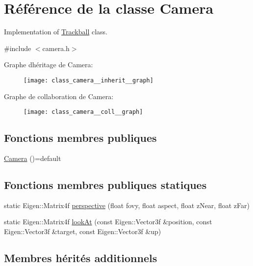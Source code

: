 \hypertarget{class_camera}{}\section{Référence de la classe Camera}
\label{class_camera}


Implementation of \hyperlink{class_trackball}{Trackball} class.  




{\ttfamily \#include $<$camera.\+h$>$}



Graphe d\textquotesingle{}héritage de Camera\+:\nopagebreak
\begin{figure}[H]
\begin{center}
\leavevmode
\texttt{[image: class\_camera\_\_inherit\_\_graph]}
\end{center}
\end{figure}


Graphe de collaboration de Camera\+:\nopagebreak
\begin{figure}[H]
\begin{center}
\leavevmode
\texttt{[image: class\_camera\_\_coll\_\_graph]}
\end{center}
\end{figure}
\subsection*{Fonctions membres publiques}
\begin{DoxyCompactItemize}
\item 
\hyperlink{class_camera_ae23af4d7cab430c77d537621cdd16b3f}{Camera} ()=default
\end{DoxyCompactItemize}
\subsection*{Fonctions membres publiques statiques}
\begin{DoxyCompactItemize}
\item 
static Eigen\+::\+Matrix4f \hyperlink{class_camera_aa63f48a3280871eba3a6f74a3c0f2e2e}{perspective} (float fovy, float aspect, float z\+Near, float z\+Far)
\item 
static Eigen\+::\+Matrix4f \hyperlink{class_camera_a683a2e432969a485412c28e18567c174}{look\+At} (const Eigen\+::\+Vector3f \&position, const Eigen\+::\+Vector3f \&target, const Eigen\+::\+Vector3f \&up)
\end{DoxyCompactItemize}
\subsection*{Membres hérités additionnels}


